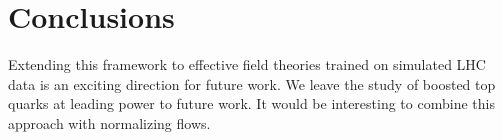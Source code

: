 \section{Conclusions}\label{sec:conclusions}

Extending this framework to effective field theories trained on
simulated LHC data is an exciting direction for future work. We leave
the study of boosted top quarks at leading power to future work. It
would be interesting to combine this approach with normalizing flows.

